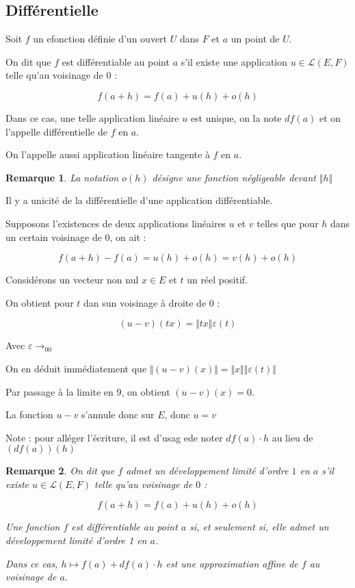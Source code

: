 \documentclass[a4paper,12pt]{book}
\newcommand{\Def}[2]{\begin{tcolorbox}[sharp corners, colback=white,colframe=blue!90!black!75, title=Définition : #1]#2\end{tcolorbox}}
\newcommand{\Prop}[2]{\begin{tcolorbox}[sharp corners, colback=white,colframe=red!90!black!75, title=Proposition : #1]#2\end{tcolorbox}}
\newcommand{\Pre}[1]{\begin{tcolorbox}[sharp corners, colback=white,colframe=green!60!green!30!black!75, title=Preuve]#1\end{tcolorbox}}
\newtheorem{Rem}{Remarque}[section]
\begin{document}
\subsection{Différentielle}
\Def{}{Soit $f$ un efonction définie d'un ouvert $U$ dans $F$ et $a$ un point de $U$.
\par On dit que $f$ est différentiable au point $a$ s'il existe une application $u\in\mathcal{L}(E,F)$ telle qu'au voisinage de $0$ :
\par $$f(a+h) = f(a) + u(h) + o(h)$$
\par Dans ce cas, une telle application linéaire $u$ est unique, on la note $df(a)$ et on l'appelle différentielle de $f$ en $a$.
\par On l'appelle aussi application linéaire tangente à $f$ en $a$.}
\begin{Rem}
La notation $o(h)$ désigne une fonction négligeable devant $\Vert h\Vert$
\end{Rem}
\Prop{}{Il y a unicité de la différentielle d'une application différentiable.}
\Pre{Supposons l'existences de deux applications linéaires $u$ et $v$ telles que pour $h$ dans un certain voisinage de $0$, on ait :
\par $$ f(a+h) - f(a) = u(h) + o(h) = v(h)+o(h)$$
\par Considérons un vecteur non nul $x\in E$ et $t$ un réel positif.
\par On obtient pour $t$ dan sun voisinage à droite de $0$ :
\par $$(u-v)(tx) = \Vert tx\Vert\varepsilon(t)$$
\par Avec $\varepsilon\to_00$
\par On en déduit immédiatement que $\Vert (u-v)(x)\Vert = \Vert x\Vert\Vert \varepsilon(t)\Vert$
\par Par passage à la limite en $9$, on obtient $(u-v)(x)=0$.
\par La fonction $u-v$ s'annule donc sur $E$, donc $u=v$}
Note : pour alléger l'écriture, il est d'usag ede noter $df(a)\cdot h$ au lieu de $(df(a))(h)$
\begin{Rem}
On dit que $f$ admet un développement limité d'ordre $1$ en $a$ s'il existe $u\in\mathcal{L}(E, F)$ telle qu'au voisinage de $0$ :
\par $$f(a+h)=f(a)+u(h)+o(h)$$
\par Une fonction $f$ est différentiable au point $a$ si, et seulement si, elle admet un développement limité d'ordre 1 en $a$.
\par Dans ce cas, $h\mapsto f(a)+df(a)\cdot h$ est une approximation affine de $f$ au voisinage de $a$.
\end{Rem}
\end{document}
